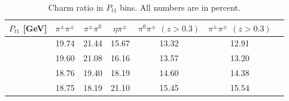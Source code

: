 \documentclass[aps,prX,preprint,groupedaddress,linenumbers]{revtex4-1}
\begin{document}
\begin{table}[h]
\centering
\begin{tabular}{|c||c|c|c|c|c|c|}
\hline
$P_{t1}$ [GeV]  &$\pi^{\pm}\pi^{\pm}$ & $\pi^{\pm}\pi^0$ & $\eta\pi^{\pm}$ & $\pi^0\pi^{\pm}$ $(z>0.3)$ & $\pi^{\pm}\pi^{\pm}$ $(z>0.3)$ \\ \hline\hline
[0,0.15]	&	19.74	&	21.44	&	15.67	&	13.32	&	12.91	\\ \hline
[0.15,0.30]	&	19.60	&	21.08	&	16.16	&	13.57	&	13.20	\\ \hline
[0.30,0.50]	&	18.76	&	19.40	&	18.19	&	14.60	&	14.38	\\ \hline
[0.50,3.0]	&	18.75	&	18.19	&	21.10	&	15.45	&	15.54	\\ \hline
\end{tabular}
\caption[Charm ratio in $P_{t1}$ bins]{Charm ratio in $P_{t1}$ bins. All numbers are in percent.}
\label{tab:sinptcharmratio}
\end{table}
\end{document}
